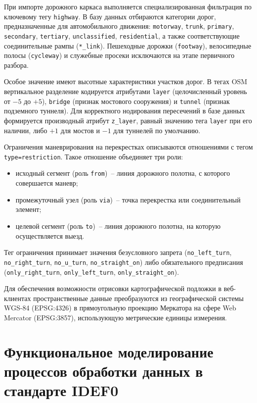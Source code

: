 При импорте дорожного каркаса выполняется специализированная фильтрация по ключевому тегу \texttt{highway}. В базу данных отбираются категории дорог, предназначенные для автомобильного движения: \texttt{motorway}, \texttt{trunk}, \texttt{primary}, \texttt{secondary}, \texttt{tertiary}, \texttt{unclassified}, \texttt{residential}, а также соответствующие соединительные рампы (\texttt{*\_link}). Пешеходные дорожки (\texttt{footway}), велосипедные полосы (\texttt{cycleway}) и служебные просеки исключаются на этапе первичного разбора.

Особое значение имеют высотные характеристики участков дорог. В тегах OSM вертикальное разделение кодируется атрибутами \texttt{layer} (целочисленный уровень от $-5$ до $+5$), \texttt{bridge} (признак мостового сооружения) и \texttt{tunnel} (признак подземного туннеля). Для корректного нодирования пересечений в базе данных формируется производный атрибут \texttt{z\_layer}, равный значению тега \texttt{layer} при его наличии, либо $+1$ для мостов и $-1$ для туннелей по умолчанию.

Ограничения маневрирования на перекрестках описываются отношениями с тегом \texttt{type=restriction}. Такое отношение объединяет три роли:
\begin{itemize}
    \item исходный сегмент (роль \texttt{from})~-- линия дорожного полотна, с которого совершается маневр;
    \item промежуточный узел (роль \texttt{via})~-- точка перекрестка или соединительный элемент;
    \item целевой сегмент (роль \texttt{to})~-- линия дорожного полотна, на которую осуществляется выезд.
\end{itemize}
Тег ограничения принимает значения безусловного запрета (\texttt{no\_left\_turn}, \texttt{no\_right\_turn}, \texttt{no\_u\_turn}, \texttt{no\_straight\_on}) либо обязательного предписания (\texttt{only\_right\_turn}, \texttt{only\_left\_turn}, \texttt{only\_straight\_on}).

Для обеспечения возможности отрисовки картографической подложки в веб-клиентах пространственные данные преобразуются из географической системы WGS-84 (EPSG:4326) в прямоугольную проекцию Меркатора на сфере Web Mercator (EPSG:3857), использующую метрические единицы измерения.

\section{Функциональное моделирование процессов обработки данных в стандарте IDEF0}
\label{sec:idef0_modeling}

